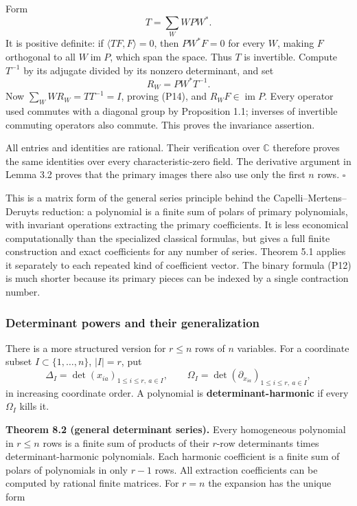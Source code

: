 \documentclass[
]{article}
\begin{document}
Form \[
T=\sum_W WPW^*.
\] It is positive definite: if \(\langle TF,F\rangle=0\), then
\(PW^*F=0\) for every \(W\), making \(F\) orthogonal to all
\(W\operatorname{im}P\), which span the space. Thus \(T\) is invertible.
Compute \(T^{-1}\) by its adjugate divided by its nonzero determinant,
and set \[
R_W=PW^*T^{-1}.
\] Now \(\sum_WWR_W=TT^{-1}=I\), proving (P14), and
\(R_WF\in\operatorname{im}P\). Every operator used commutes with a
diagonal group by Proposition 1.1; inverses of invertible commuting
operators also commute. This proves the invariance assertion.

All entries and identities are rational. Their verification over
\(\mathbb C\) therefore proves the same identities over every
characteristic-zero field. The derivative argument in Lemma 3.2 proves
that the primary images there also use only the first \(n\) rows.
\(\square\)

This is a matrix form of the general series principle behind the
Capelli--Mertens--Deruyts reduction: a polynomial is a finite sum of
polars of primary polynomials, with invariant operations extracting the
primary coefficients. It is less economical computationally than the
specialized classical formulas, but gives a full finite construction and
exact coefficients for any number of series. Theorem 5.1 applies it
separately to each repeated kind of coefficient vector. The binary
formula (P12) is much shorter because its primary pieces can be indexed
by a single contraction number.

\subsubsection{Determinant powers and their
generalization}\label{determinant-powers-and-their-generalization}

There is a more structured version for \(r\leq n\) rows of \(n\)
variables. For a coordinate subset \(I\subset\{1,\ldots,n\}\),
\(|I|=r\), put \[
\Delta_I=\det(x_{ia})_{1\leq i\leq r,\ a\in I},
\qquad
\Omega_I=\det(\partial_{x_{ia}})_{1\leq i\leq r,\ a\in I},
\] in increasing coordinate order. A polynomial is
\textbf{determinant-harmonic} if every \(\Omega_I\) kills it.

\protect{}\label{theorem-8-2}{}

\textbf{Theorem 8.2 (general determinant series).} Every homogeneous
polynomial in \(r\leq n\) rows is a finite sum of products of their
\(r\)-row determinants times determinant-harmonic polynomials. Each
harmonic coefficient is a finite sum of polars of polynomials in only
\(r-1\) rows. All extraction coefficients can be computed by rational
finite matrices. For \(r=n\) the expansion has the unique form
\protect{}\label{equation-P17}{}
\end{document}

